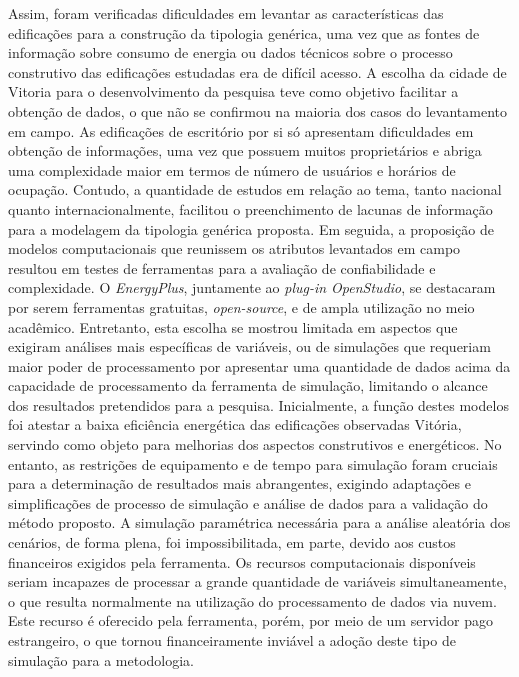 \noindent Assim, foram verificadas dificuldades em levantar as características das edificações para a construção da tipologia genérica, uma vez que as fontes de informação sobre consumo de energia ou dados técnicos sobre o processo construtivo das edificações estudadas era de difícil acesso.\vspace*{0.3cm} \newline
\noindent A escolha da cidade de Vitoria para o desenvolvimento da pesquisa teve como objetivo facilitar a obtenção de dados, o que não se confirmou na maioria dos casos do levantamento em campo. As edificações de escritório por si só apresentam dificuldades em obtenção de informações, uma vez que possuem muitos proprietários e abriga uma complexidade maior em termos de número de usuários e horários de ocupação. Contudo, a quantidade de estudos em relação ao tema, tanto nacional quanto internacionalmente, facilitou o preenchimento de lacunas de informação para a modelagem da tipologia genérica proposta.\vspace*{0.3cm} \newline
\noindent Em seguida, a proposição de modelos computacionais que reunissem os atributos levantados em campo resultou em testes de ferramentas para a avaliação de confiabilidade e complexidade. O \textit{EnergyPlus}, juntamente ao \textit{plug-in OpenStudio}, se destacaram por serem ferramentas gratuitas, \textit{open-source}, e de ampla utilização no meio acadêmico. Entretanto, esta escolha se mostrou limitada em aspectos que exigiram análises mais específicas de variáveis, ou de simulações que requeriam maior poder de processamento por apresentar uma quantidade de dados acima da capacidade de processamento da ferramenta de simulação, limitando o alcance dos resultados pretendidos para a pesquisa.\vspace*{0.3cm} \newline
\noindent Inicialmente, a função destes modelos foi atestar a baixa eficiência energética das edificações observadas Vitória, servindo como objeto para melhorias dos aspectos construtivos e energéticos. No entanto, as restrições de equipamento e de tempo para simulação foram cruciais para a determinação de resultados mais abrangentes, exigindo adaptações e simplificações de processo de simulação e análise de dados para a validação do método proposto. A simulação paramétrica necessária para a análise aleatória dos cenários, de forma plena, foi impossibilitada, em parte, devido aos custos financeiros exigidos pela ferramenta. Os recursos computacionais disponíveis seriam incapazes de processar a grande quantidade de variáveis simultaneamente, o que resulta normalmente na utilização do processamento de dados via nuvem. Este recurso é oferecido pela ferramenta, porém, por meio de um servidor pago estrangeiro, o que tornou financeiramente inviável a adoção deste tipo de simulação para a metodologia.\vspace*{0.3cm} \newline
